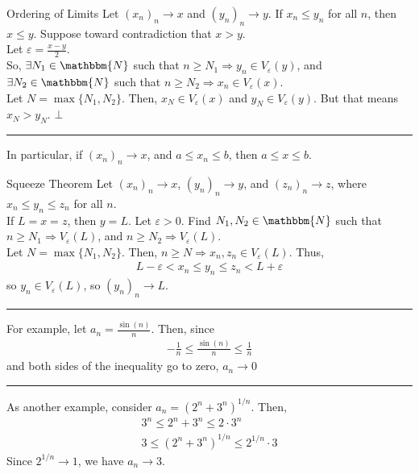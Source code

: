 \documentclass[10pt]{extarticle}
\newcommand{\N}{\mathbbm{N}}
\begin{document}
  \begin{problem}{Ordering of Limits}
    Let $(x_n)_n \rightarrow x$ and $(y_n)_n \rightarrow y$. If $x_n \leq y_n$ for all $n$, then $x \leq y$.
    \tcblower
    Suppose toward contradiction that $x > y$.\\
    
    Let $\varepsilon = \frac{x-y}{2}$.\\

    So, $\exists N_1\in\N$ such that $n\geq N_1 \Rightarrow y_n\in V_{\varepsilon}(y)$, and $\exists N_2\in\N$ such that $n\geq N_2 \Rightarrow x_n\in V_{\varepsilon}(x)$.\\
    
    Let $N = \max\{N_1,N_2\}$. Then, $x_N\in V_{\varepsilon}(x)$ and $y_N\in V_{\varepsilon}(y)$. But that means $x_N > y_N$. $\bot$
    \vspace{4pt}
    \rule{\textwidth}{0.4pt}
    \vspace{4pt}
    In particular, if $(x_n)_n \rightarrow x$, and $a \leq x_n \leq b$, then $a\leq x \leq b$.
  \end{problem}
  \begin{problem}{Squeeze Theorem}
    Let $(x_n)_n \rightarrow x$, $(y_n)_n\rightarrow y$, and $(z_n)_n \rightarrow z$, where $x_n \leq y_n \leq z_n$ for all $n$.\\

    If $L = x = z$, then $y = L$.
    \tcblower
    Let $\varepsilon > 0$. Find $N_1,N_2\in\N$ such that $n\geq N_1 \Rightarrow V_{\varepsilon}(L)$, and $n\geq N_{2} \Rightarrow V_{\varepsilon}(L)$.\\

    Let $N = \max\{N_1,N_2\}$. Then, $n\geq N \Rightarrow x_n,z_n\in V_{\varepsilon}(L)$. Thus,
    \begin{align*}
      L-\varepsilon < x_n \leq y_n \leq z_n < L + \varepsilon
    \end{align*}
    so $y_n\in V_{\varepsilon}(L)$, so $(y_n)_n \rightarrow L$.\\
    \vspace{4pt}
    \rule{\textwidth}{0.4pt}
    \vspace{4pt}
    For example, let $a_n = \frac{\sin(n)}{n}$. Then, since
    \begin{align*}
      -\frac{1}{n} \leq \frac{\sin(n)}{n} \leq \frac{1}{n}
    \end{align*}
    and both sides of the inequality go to zero, $a_n \rightarrow 0$\\
    \vspace{4pt}
    \rule{\textwidth}{0.4pt}
    \vspace{4pt}
    As another example, consider $a_n = \left(2^n + 3^n\right)^{1/n}$. Then,
    \begin{align*}
      3^n \leq 2^n + 3^n \leq 2\cdot 3^n\\
      3 \leq \left(2^n + 3^n\right)^{1/n} \leq 2^{1/n}\cdot 3
    \end{align*}
    Since $2^{1/n} \rightarrow 1$, we have $a_n \rightarrow 3$.
  \end{problem}
\end{document}
